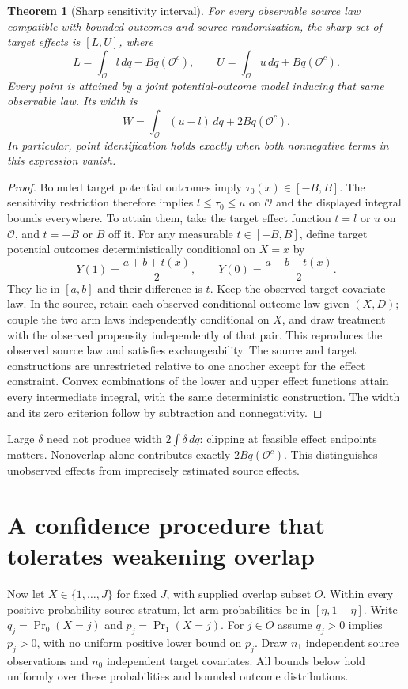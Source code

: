 \documentclass[11pt]{article}
\newtheorem{theorem}{Theorem}
\theoremstyle{remark}\newtheorem{remark}[theorem]{Remark}
\begin{document}
\begin{theorem}[Sharp sensitivity interval]\label{sharp}
For every observable source law compatible with bounded outcomes and source randomization, the sharp set of target effects is $[L,U]$, where
\[
 L=\int_{\mathcal O}l\,dq-Bq(\mathcal O^c),\qquad
 U=\int_{\mathcal O}u\,dq+Bq(\mathcal O^c).
\]
Every point is attained by a joint potential-outcome model inducing that same observable law. Its width is
\[
 W=\int_{\mathcal O}(u-l)\,dq+2Bq(\mathcal O^c).
\]
In particular, point identification holds exactly when both nonnegative terms in this expression vanish.
\end{theorem}
\begin{proof}
Bounded target potential outcomes imply $\tau_0(x)\in[-B,B]$. The sensitivity restriction therefore implies $l\leq\tau_0\leq u$ on $\mathcal O$ and the displayed integral bounds everywhere. To attain them, take the target effect function $t=l$ or $u$ on $\mathcal O$, and $t=-B$ or $B$ off it. For any measurable $t\in[-B,B]$, define target potential outcomes deterministically conditional on $X=x$ by
\[
 Y(1)=\frac{a+b+t(x)}2,\qquad
 Y(0)=\frac{a+b-t(x)}2.
\]
They lie in $[a,b]$ and their difference is $t$. Keep the observed target covariate law. In the source, retain each observed conditional outcome law given $(X,D)$; couple the two arm laws independently conditional on $X$, and draw treatment with the observed propensity independently of that pair. This reproduces the observed source law and satisfies exchangeability. The source and target constructions are unrestricted relative to one another except for the effect constraint. Convex combinations of the lower and upper effect functions attain every intermediate integral, with the same deterministic construction. The width and its zero criterion follow by subtraction and nonnegativity.
\end{proof}

Large $\delta$ need not produce width $2\int\delta\,dq$: clipping at feasible effect endpoints matters. Nonoverlap alone contributes exactly $2Bq(\mathcal O^c)$. This distinguishes unobserved effects from imprecisely estimated source effects.

\section{A confidence procedure that tolerates weakening overlap}
Now let $X\in\{1,\ldots,J\}$ for fixed $J$, with supplied overlap subset $O$. Within every positive-probability source stratum, let arm probabilities be in $[\eta,1-\eta]$. Write $q_j=\Pr_0(X=j)$ and $p_j=\Pr_1(X=j)$. For $j\in O$ assume $q_j>0$ implies $p_j>0$, with no uniform positive lower bound on $p_j$. Draw $n_1$ independent source observations and $n_0$ independent target covariates. All bounds below hold uniformly over these probabilities and bounded outcome distributions.
\end{document}
